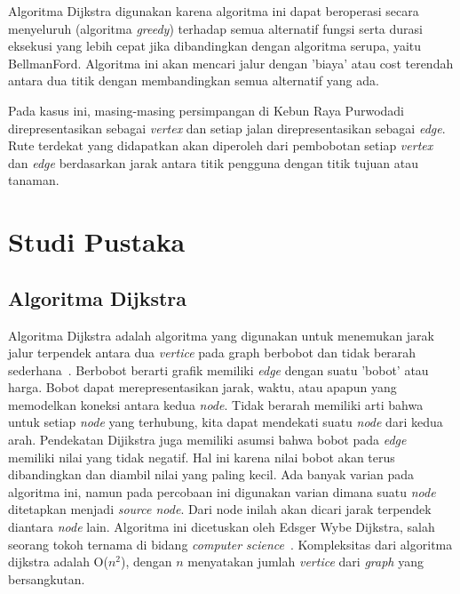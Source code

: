 \documentclass[conference]{IEEEtran}
\begin{document}
	Algoritma Dijkstra digunakan karena algoritma ini dapat beroperasi secara menyeluruh (algoritma \textit{greedy}) terhadap semua alternatif fungsi serta durasi eksekusi yang lebih cepat jika dibandingkan dengan algoritma serupa, yaitu BellmanFord. Algoritma ini akan mencari jalur dengan ’biaya’ atau cost terendah antara dua titik dengan membandingkan semua alternatif yang ada.

	Pada kasus ini, masing-masing persimpangan di Kebun Raya Purwodadi direpresentasikan sebagai \textit{vertex} dan setiap jalan direpresentasikan sebagai \textit{edge}. Rute terdekat yang didapatkan akan diperoleh dari pembobotan setiap \textit{vertex} dan \textit{edge} berdasarkan jarak antara titik pengguna dengan titik tujuan atau tanaman.

	\section{Studi Pustaka}
	\subsection{Algoritma Dijkstra}
	Algoritma Dijkstra adalah algoritma yang digunakan untuk menemukan jarak jalur terpendek antara dua \textit{vertice} pada graph berbobot dan tidak berarah sederhana~\cite{ref2}. Berbobot berarti grafik memiliki \textit{edge} dengan suatu ’bobot’ atau harga. Bobot dapat merepresentasikan jarak, waktu, atau apapun yang memodelkan koneksi antara kedua \textit{node}. Tidak berarah memiliki arti bahwa untuk setiap \textit{node} yang terhubung, kita dapat mendekati suatu \textit{node} dari kedua arah. Pendekatan Dijikstra juga memiliki asumsi bahwa bobot pada \textit{edge} memiliki nilai yang tidak negatif. Hal ini karena nilai bobot akan terus dibandingkan dan diambil nilai yang paling kecil. Ada banyak varian pada algoritma ini, namun pada percobaan ini digunakan varian dimana suatu \textit{node} ditetapkan menjadi \textit{source node}. Dari node inilah akan dicari jarak terpendek diantara \textit{node} lain. Algoritma ini dicetuskan oleh Edsger Wybe Dijkstra, salah seorang tokoh ternama di bidang \textit{computer science}~\cite{ref3}. Kompleksitas dari algoritma dijkstra adalah O(\begin{math} n^2 \end{math}), dengan \begin{math} n \end{math} menyatakan jumlah \textit{vertice} dari \textit{graph} yang bersangkutan.
\end{document}
